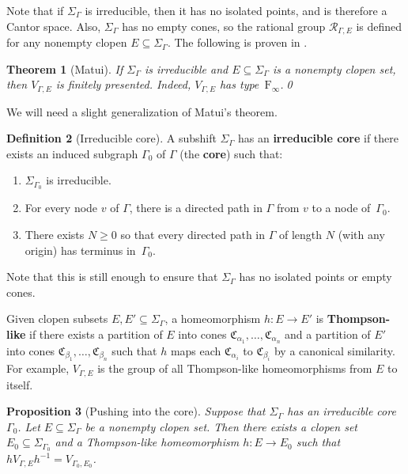 \documentclass[11pt,letterpaper]{amsart}
\newtheorem{theorem}{Theorem}[section]
\newtheorem{proposition}[theorem]{Proposition}
\theoremstyle{definition}
\newtheorem{definition}[theorem]{Definition}
\newcommand{\newword}[1]{\textbf{#1}}
\newcommand{\R}{\mathcal{R}}
\newcommand{\C}{\mathfrak{C}}
\newcommand{\F}{\mathrm{F}}
\begin{document}
Note that if $\Sigma_\Gamma$ is irreducible, then it has no isolated points, and is therefore a Cantor space. Also, $\Sigma_\Gamma$ has no empty cones, so the rational group $\R_{\Gamma,E}$ is defined for any nonempty clopen $E\subseteq \Sigma_\Gamma$. The following is proven in \cite[Theorem~6.21]{Matui15}.

\begin{theorem}[Matui] 
If\/ $\Sigma_\Gamma$ is irreducible and $E\subseteq \Sigma_\Gamma$ is a nonempty clopen set, then $V_{\Gamma,E}$ is finitely presented.  Indeed, $V_{\Gamma,E}$ has type\/~$\F_{\!\infty}$.\qed
\end{theorem}

We will need a slight generalization of Matui's theorem.

\begin{definition}[Irreducible core]
A subshift $\Sigma_\Gamma$ has an \newword{irreducible core} if there exists an induced subgraph $\Gamma_0$ of $\Gamma$ (the \newword{core}) such that:
\begin{enumerate}
    \item $\Sigma_{\Gamma_0}$ is irreducible.\smallskip
    \item For every node $v$ of $\Gamma$, there is a directed path in $\Gamma$ from $v$ to a node of~$\Gamma_0$.\smallskip
    \item There exists $N\geq 0$ so that every directed path in $\Gamma$ of length $N$ (with any origin) has terminus in~$\Gamma_0$.
\end{enumerate}
\end{definition}

Note that this is still enough to ensure that $\Sigma_\Gamma$ has no isolated points or empty cones.

Given clopen subsets $E,E'\subseteq \Sigma_\Gamma$,  a homeomorphism $h\colon E\to E'$ is \newword{Thompson-like} if there exists a partition of $E$ into cones $\C_{\alpha_1},\dots,\C_{\alpha_n}$ and a partition of $E'$ into cones $\C_{\beta_1},\dots,\C_{\beta_n}$ such that $h$ maps each $\C_{\alpha_i}$ to $\C_{\beta_i}$ by a canonical similarity.  For example, $V_{\Gamma,E}$ is the group of all Thompson-like homeomorphisms from $E$ to itself.

\begin{proposition}[Pushing into the core]\label{prop:push_into_core}
Suppose that\/ $\Sigma_\Gamma$ has an irreducible core\/ $\Gamma_0$. Let $E\subseteq \Sigma_\Gamma$ be a nonempty clopen set.  Then there exists a clopen set $E_0\subseteq \Sigma_{\Gamma_0}$ and a Thompson-like homeomorphism $h\colon E\to E_0$ such that $hV_{\Gamma,E}h^{-1} = V_{\Gamma_0,E_0}$.
\end{proposition}
\end{document}
